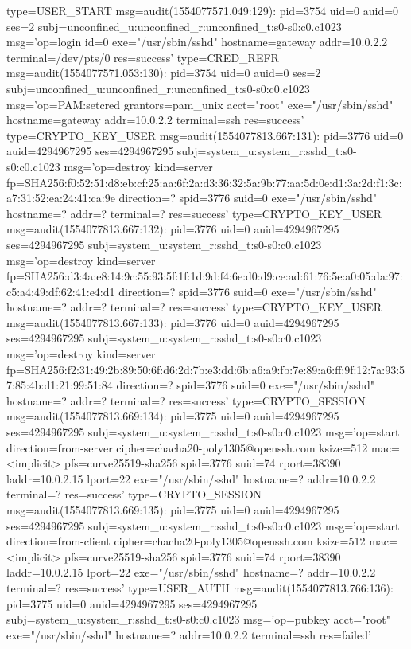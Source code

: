 \documentclass[]{report}
\newenvironment{Shaded}{}{}
\newcommand{\NormalTok}[1]{#1}
\begin{document}
\begin{Shaded}
\begin{Highlighting}[]
\NormalTok{type=USER_START msg=audit(1554077571.049:129): pid=3754 uid=0 auid=0 ses=2 subj=unconfined_u:unconfined_r:unconfined_t:s0-s0:c0.c1023 msg='op=login id=0 exe="/usr/sbin/sshd" hostname=gateway addr=10.0.2.2 terminal=/dev/pts/0 res=success'}
\NormalTok{type=CRED_REFR msg=audit(1554077571.053:130): pid=3754 uid=0 auid=0 ses=2 subj=unconfined_u:unconfined_r:unconfined_t:s0-s0:c0.c1023 msg='op=PAM:setcred grantors=pam_unix acct="root" exe="/usr/sbin/sshd" hostname=gateway addr=10.0.2.2 terminal=ssh res=success'}
\NormalTok{type=CRYPTO_KEY_USER msg=audit(1554077813.667:131): pid=3776 uid=0 auid=4294967295 ses=4294967295 subj=system_u:system_r:sshd_t:s0-s0:c0.c1023 msg='op=destroy kind=server fp=SHA256:f0:52:51:d8:eb:cf:25:aa:6f:2a:d3:36:32:5a:9b:77:aa:5d:0e:d1:3a:2d:f1:3c:a7:31:52:ea:24:41:ca:9e direction=? spid=3776 suid=0  exe="/usr/sbin/sshd" hostname=? addr=? terminal=? res=success'}
\NormalTok{type=CRYPTO_KEY_USER msg=audit(1554077813.667:132): pid=3776 uid=0 auid=4294967295 ses=4294967295 subj=system_u:system_r:sshd_t:s0-s0:c0.c1023 msg='op=destroy kind=server fp=SHA256:d3:4a:e8:14:9c:55:93:5f:1f:1d:9d:f4:6e:d0:d9:ce:ad:61:76:5e:a0:05:da:97:c5:a4:49:df:62:41:e4:d1 direction=? spid=3776 suid=0  exe="/usr/sbin/sshd" hostname=? addr=? terminal=? res=success'}
\NormalTok{type=CRYPTO_KEY_USER msg=audit(1554077813.667:133): pid=3776 uid=0 auid=4294967295 ses=4294967295 subj=system_u:system_r:sshd_t:s0-s0:c0.c1023 msg='op=destroy kind=server fp=SHA256:f2:31:49:2b:89:50:6f:d6:2d:7b:e3:dd:6b:a6:a9:fb:7e:89:a6:ff:9f:12:7a:93:57:85:4b:d1:21:99:51:84 direction=? spid=3776 suid=0  exe="/usr/sbin/sshd" hostname=? addr=? terminal=? res=success'}
\NormalTok{type=CRYPTO_SESSION msg=audit(1554077813.669:134): pid=3775 uid=0 auid=4294967295 ses=4294967295 subj=system_u:system_r:sshd_t:s0-s0:c0.c1023 msg='op=start direction=from-server cipher=chacha20-poly1305@openssh.com ksize=512 mac=<implicit> pfs=curve25519-sha256 spid=3776 suid=74 rport=38390 laddr=10.0.2.15 lport=22  exe="/usr/sbin/sshd" hostname=? addr=10.0.2.2 terminal=? res=success'}
\NormalTok{type=CRYPTO_SESSION msg=audit(1554077813.669:135): pid=3775 uid=0 auid=4294967295 ses=4294967295 subj=system_u:system_r:sshd_t:s0-s0:c0.c1023 msg='op=start direction=from-client cipher=chacha20-poly1305@openssh.com ksize=512 mac=<implicit> pfs=curve25519-sha256 spid=3776 suid=74 rport=38390 laddr=10.0.2.15 lport=22  exe="/usr/sbin/sshd" hostname=? addr=10.0.2.2 terminal=? res=success'}
\NormalTok{type=USER_AUTH msg=audit(1554077813.766:136): pid=3775 uid=0 auid=4294967295 ses=4294967295 subj=system_u:system_r:sshd_t:s0-s0:c0.c1023 msg='op=pubkey acct="root" exe="/usr/sbin/sshd" hostname=? addr=10.0.2.2 terminal=ssh res=failed'}

\end{Highlighting}
\end{Shaded}
\end{document}
